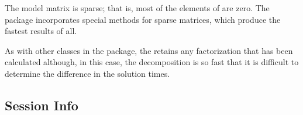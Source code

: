 \Rcodeplaceholder{}

The model matrix  is sparse; that is, most of the elements of
 are zero.  The  package incorporates special
methods for sparse matrices, which produce the fastest results of all.

\Rcodeplaceholder{}

As with other classes in the  package, the
 retains any factorization that has been calculated
although, in this case, the decomposition is so fast that it is
difficult to determine the difference in the solution times.

\Rcodeplaceholder{}

\subsection*{Session Info}

\Rcodeplaceholder{}

\Rcodeplaceholder{}

\Rcodeplaceholder{}

\Rcodeplaceholder{}
